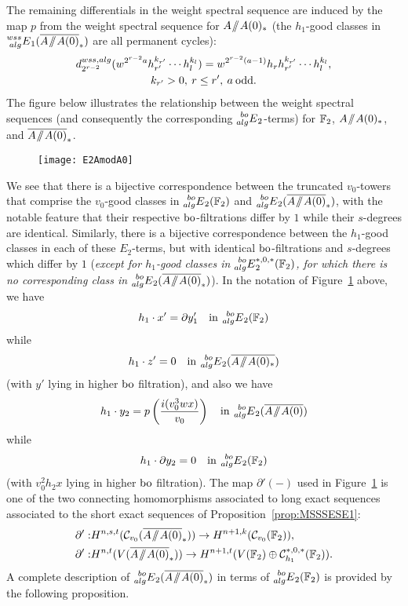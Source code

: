 The remaining differentials in the weight spectral sequence are induced by the map $p$ from the weight spectral sequence for $A \! \sslash \! A(0)_*$ (the $h_1$-good classes in $\E{wss}{alg}_1(\AA0)$ are all permanent cycles):
\begin{multline}\label{eq:drwssAmodA0}
d_{2^{r-2}}^{wss, alg}(w^{2^{r-2} a}h_{r'}^{k_{r'}}  \cdots h_l^{k_l}) = w^{2^{r-2}(a-1)} h_r h_{r'}^{k_{r'}}  \cdots h_l^{k_l}, \\
k_{r'} > 0, \: r \le r', \: a \: \mathrm{odd}. 
\end{multline}
The figure below illustrates the relationship between the weight spectral sequences (and consequently the corresponding $\prescript{bo}{alg}{E}_2$-terms) for $\mathbb{F}_2$, $A \! \sslash \! A(0)_*$, and $\AA0$.


\begin{figure}[h]
\centering
\texttt{[image: E2AmodA0]}
\caption{}
\label{fig:E2AmodA0}
\end{figure}


We see that there is a bijective correspondence between the truncated $v_0$-towers that comprise the $v_0$-good classes in $\prescript{bo}{alg}{E}_2(\mathbb{F}_2)$ and $\E{bo}{alg}_2(\AA0)$, with the notable feature that their respective $\mathrm{bo}$-filtrations differ by $1$ while their $s$-degrees are identical.  Similarly, there is a bijective correspondence between the $h_1$-good classes in each of these $E_2$-terms, but with identical $\mathrm{bo}$-filtrations and $s$-degrees which differ by $1$ (\emph{except for $h_1$-good classes in $\prescript{bo}{alg}{E}_2^{*,0,*}(\mathbb{F}_2)$, for which there is no corresponding class in $\prescript{bo}{alg}{E}_2(\overline{A\! \sslash \! A(0)}_*)$}).    In the notation of Figure~\ref{fig:E2AmodA0} above, we have
$$ h_1 \cdot x' = \partial y_1' \quad \mathrm{in} \: \prescript{bo}{alg}{E}_2(\mathbb{F}_2) $$
while 
$$ h_1 \cdot z' = 0 \quad \mathrm{in} \: \prescript{bo}{alg}{E}_2(\overline{A \! \sslash \! A(0)_*}) $$
(with $y'$ lying in higher $\mathrm{bo}$ filtration), and also we have
$$ h_1 \cdot y_2 = p\left( \frac{i(v_0^3wx)}{v_0} \right) \quad \mathrm{in} \: \prescript{bo}{alg}{E}_2(\overline{A \! \sslash \! A(0)}) $$
while 
$$ h_1 \cdot \partial y_2 = 0 \quad \mathrm{in} \: \prescript{bo}{alg}{E}_2(\mathbb{F}_2) $$
(with 
$v_0^2 h_2 x$ lying in higher $\mathrm{bo}$ filtration).  The map $\partial'(-)$ used in Figure~\ref{fig:E2AmodA0} is one of the two connecting homomorphisms associated to long exact sequences associated to the short exact sequences of Proposition~\ref{prop:MSSSESE1}:
\begin{align*}
\partial': & H^{n,s,t}(\mc{C}_{v_0}(\AA0)) \rightarrow H^{n+1,k}(\mc{C}_{v_0}(\FF_2)), \\
\partial': & H^{n,t}(V(\AA0)) \rightarrow H^{n+1,t}(V(\FF_2) \oplus \mc{C}^{*,0,*}_{h_1}(\FF_2)). 
\end{align*}
A complete description of $\prescript{bo}{alg}{E}_2(\overline{A\! \sslash \! A(0)}_*)$ in terms of $\prescript{bo}{alg}{E}_2(\mathbb{F}_2)$ is provided by the following proposition.

